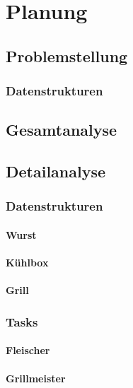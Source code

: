 \chapter{Planung}

\section{Problemstellung}

\subsection{Datenstrukturen}

\section{Gesamtanalyse}

\section{Detailanalyse}

\subsection{Datenstrukturen}

\subsubsection{Wurst}

\subsubsection{Kühlbox}

\subsubsection{Grill}

\subsection{Tasks}

\subsubsection{Fleischer}

\subsubsection{Grillmeister}

